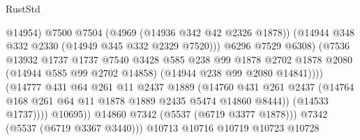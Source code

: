 \begin{lexlean}{RustStd}
\begin{coremodule}
                                            @14954)
                                          @7500
                                          @7504
                                          (@4969 (@14936 @342 @42 @2326 @1878))
                                          (@14944 @348 @332 @2330 (@14949 @345 @332 @2329 @7520)))
                                        @6296
                                        @7529
                                        @6308)
                                      (@7536
                                        @13932
                                        @1737
                                        @1737
                                        @7540
                                        @3428
                                        @585
                                        @238
                                        @99
                                        @1878
                                        @2702
                                        @1878
                                        @2080
                                        (@14944 @585 @99 @2702 @14858)
                                        (@14944 @238 @99 @2080 @14841))))
                                  (@14777
                                    @431
                                    @64
                                    @261
                                    @11
                                    @2437
                                    @1889
                                    (@14760
                                      @431
                                      @261
                                      @2437
                                      (@14764
                                        @168
                                        @261
                                        @64
                                        @11
                                        @1878
                                        @1889
                                        @2435
                                        @5474
                                        @14860
                                        @8444))
                                    (@14533 @1737))))
                              @10695))
                          @14860
                          @7342
                          (@5537 (@6719 @3377 @1878)))
                        @7342
                        (@5537 (@6719 @3367 @3440)))
                      @10713
                      @10716
                      @10719
                      @10723
                      @10728

\end{coremodule}
\end{lexlean}
